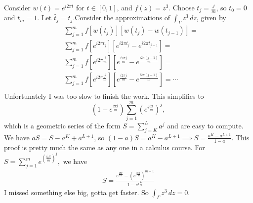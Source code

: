 \begin{example}
    Consider $w(t)=e^{i2\pi t}$ for $t\in [0,1]$, and $f(z)=z^3$. Choose $t_j=\frac{j}{m}$, so $t_0=0$ and $t_m=1$. Let $\hat{t}_j=t_j$.Consider the approximations of $\int_{\Gamma}z^3  \, dz$, given by 
    \begin{align*}
        &\sum_{j=1}^{m} f[w(t_j)][w(t_j)-w(t_{j-1})]=\\
        &\sum_{j=1}^{m} f[e^{i2\pi t_j}][e^{i2\pi t_j}-e^{i2\pi t_{j-1}}]=\\
        &\sum_{j=1}^{m} f[e^{i2\pi \frac{j}{m}}][e^{\frac{i2\pi j}{m}}-e^{\frac{i2\pi (j-1)}{m}}]=\\
        &\sum_{j=1}^{m} f[e^{i2\pi \frac{j}{m}}][e^{\frac{i2\pi j}{m}}-e^{\frac{i2\pi (j-1)}{m}}]=\cdots\\
    \end{align*}
    Unfortunately I was too slow to finish the work. This simplifies to \[
        \left( 1-e^{\frac{2\pi i}{m}} \right) \sum_{j=1}^{m} \left( e^{i \frac{8\pi }{m}} \right) ^{j}, 
    \] which is a geometric series of the form $S=\sum_{j=K}^{L} a^{j}$ and are easy to compute. We have $aS=S-a^{K}+a^{L+1}$, so $(1-a)S=a^{K}-a^{L+1}\implies S=\frac{a^{K}-a^{L+1}}{1-a}$. This proof is pretty much the same as any one in a calculus course. For $S=\sum_{j=1}^{m} e^{\left( \frac{i_8\pi}{m} \right) ^j},$ we have 
     \begin{gather}
         S=\frac{e^{\frac{i8\pi}{m}}-\left( e^{i \frac{8\pi}{m}} \right) ^{m+1}}{1-e^{i \frac{8\pi}{m}}}    
     \end{gather} I missed something else big, gotta get faster. So $\int _{\Gamma}z^3 \, dz=0$.
\end{example}



